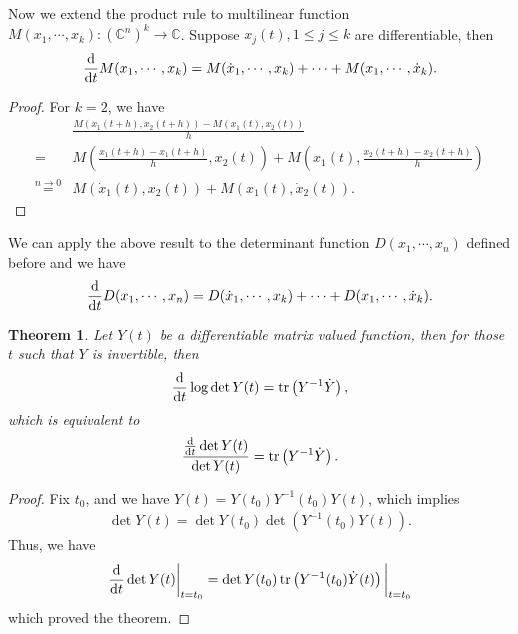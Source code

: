 \documentclass[11pt]{book}
\newtheorem{theorem}{Theorem}[section]
\theoremstyle{definition}
\numberwithin{equation}{subsection}
\begin{document}
Now we extend the product rule to multilinear function $M(x_1,\cdots, x_k): \left(\mathbb{C}^n\right)^k \to \mathbb{C}$. Suppose $x_j(t), 1\leq j \leq k$ are differentiable, then 
\begin{align*}
    \dv{}{t}M(x_1,\cdots, x_k) = M(\dot{x}_1,\cdots, x_k) + \cdots + M(x_1,\cdots, \dot{x}_k).
\end{align*}
\begin{proof}
For $k=2$, we have
\begin{align*}
    & \frac{M(x_1(t+h), x_2(t+h)) - M(x_1(t), x_2(t))}{h} \\
    = & M\left(\frac{x_1(t+h)-x_1(t+h)}{h}, x_2(t)\right) + M\left(x_1(t),\frac{x_2(t+h)-x_2(t+h)}{h} \right) \\
    \overset{n\to 0}{=} & M(\dot{x}_1(t), x_2(t)) + M(x_1(t), \dot{x}_2(t)).
\end{align*}
\end{proof}

We can apply the above result to the determinant function $D(x_1,\cdots,x_n)$ defined before and we have
\begin{align*}
    \dv{}{t}D(x_1,\cdots,x_n) = D(\dot{x}_1,\cdots, x_k) + \cdots + D(x_1,\cdots, \dot{x}_k).
\end{align*}

\medskip

\begin{theorem}\label{trace_determinant}
Let $Y(t)$ be a differentiable matrix valued function, then for those $t$ such that $Y$ is invertible, then
\begin{align*}
    \dv{}{t} \log \det Y(t) = \tr \left(Y^{-1} \dot{Y}\right),
\end{align*}
which is equivalent to 
\begin{align*}
    \frac{\dv{}{t}\det Y(t)}{\det Y(t)} = \tr \left(Y^{-1} \dot{Y}\right).
\end{align*}
\end{theorem}
\begin{proof}
Fix $t_0$, and we have $Y(t) = Y(t_0) Y^{-1}(t_0) Y(t)$, which implies
\begin{align*}
    \det Y(t) = \det Y(t_0) \det (Y^{-1}(t_0) Y(t)).
\end{align*}
Thus, we have
\begin{align*}
    \dv{}{t}\det Y(t)\bigg|_{t=t_0} = \det Y(t_0) \tr \left(Y^{-1}(t_0) \dot{Y}(t) \right)\bigg|_{t=t_0}
\end{align*}
which proved the theorem.
\end{proof}
\end{document}
